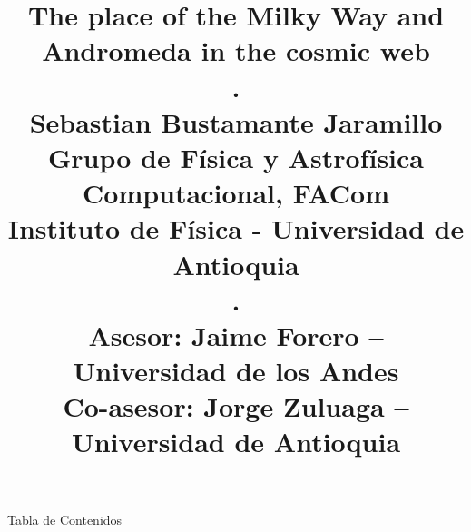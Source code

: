 \documentclass[8pt,fleqn]{beamer}
\title{\textbf{The place of the Milky Way and Andromeda in the cosmic web} \\ .\\ 
\small{Sebastian Bustamante Jaramillo\\ 
Grupo de Física y Astrofísica Computacional, FACom\\
Instituto de Física - Universidad de Antioquia \\ .\\  
\textbf{Asesor:} Jaime Forero -- Universidad de los Andes \\
\textbf{Co-asesor:} Jorge Zuluaga -- Universidad de Antioquia}
\author[Sebastian Bustamante]{}}
\institute[FACom]{}
\begin{document}
\justifying


\begin{frame}
\titlepage
\end{frame}
\begin{frame}
\begin{block}{Tabla de Contenidos}
\

	\tableofcontents	

\	
\end{block}
\end{frame}

\end{document}
